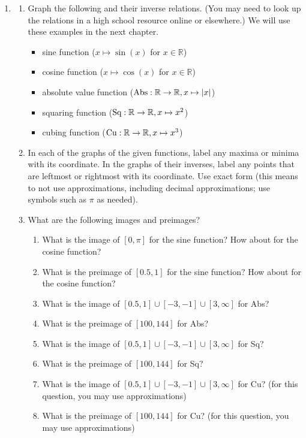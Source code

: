 \documentclass[11pt]{article}
\newcommand\tn{\textnormal}
\newcommand{\R}{\mathbb{R}}
\theoremstyle{definition}
\begin{document}
\begin{enumerate}[resume]
\item \label{h: key graphs} 
	\begin{enumerate}
	\item Graph the following and their inverse relations. (You may need to look up the relations in a high school resource online or elsewhere.) We will use these examples in the next chapter.
		\begin{itemize}
		\item sine function ($x\mapsto \sin(x)$ for $x\in \R$)
		\item cosine function ($x\mapsto \cos(x)$ for $x\in \R$)
		\item absolute value function ($\tn{Abs}: \R\to\R, x\mapsto |x|$)
		\item squaring function  ($\tn{Sq}: \R\to\R, x\mapsto x^2$)
		\item cubing function ($\tn{Cu}: \R\to\R, x\mapsto x^3$)
		\end{itemize}	
	\item In each of the graphs of the given functions, label any maxima or minima with its coordinate. In the graphs of their inverses, label any points that are leftmost or rightmost with its coordinate. Use exact form (this means to not use approximations, including decimal approximations; use symbols such as $\pi$ as needed).
	\item What are the following images and preimages?
		\begin{enumerate}
		\item What is the image of $[0,\pi]$ for the sine function? How about for the cosine function?
		\item What is the preimage of $[0.5,1]$ for the sine function? How about for the cosine function?
		\item What is the image of $[0.5,1]\cup[-3,-1]\cup[3,\infty]$ for Abs?
		\item What is the preimage of $[100, 144]$ for Abs?
		\item What is the image of $[0.5,1]\cup[-3,-1]\cup[3,\infty]$ for Sq?
		\item What is the preimage of $[100, 144]$ for Sq?
		\item What is the image of $[0.5,1]\cup[-3,-1]\cup[3,\infty]$ for Cu? (for this question, you may use approximations)
		\item What is the preimage of $[100, 144]$ for Cu? (for this question, you may use approximations)
		\end{enumerate}
	\end{enumerate}


\end{enumerate}
\end{document}
